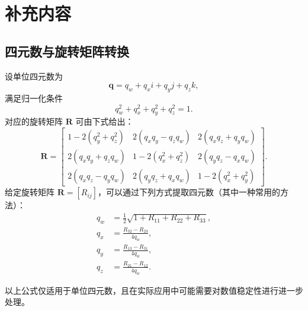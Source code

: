 
\chapter{补充内容}

\section{四元数与旋转矩阵转换}
\label{appendix:quat}
设单位四元数为
\begin{equation}
\symbf{q} = q_w + q_x i + q_y j + q_z k,
\end{equation}
满足归一化条件
\begin{equation}
q_w^2 + q_x^2 + q_y^2 + q_z^2 = 1.
\end{equation}
对应的旋转矩阵 \(\symbf{R}\) 可由下式给出：
\begin{equation}
  \symbf{R} = \begin{bmatrix}
1 - 2(q_y^2 + q_z^2) & 2(q_xq_y - q_zq_w) & 2(q_xq_z + q_yq_w) \\
2(q_xq_y + q_zq_w) & 1 - 2(q_x^2 + q_z^2) & 2(q_yq_z - q_xq_w) \\
2(q_xq_z - q_yq_w) & 2(q_yq_z + q_xq_w) & 1 - 2(q_x^2 + q_y^2)
\end{bmatrix}.
\end{equation}
给定旋转矩阵 \(\symbf{R} = [R_{ij}]\)，可以通过下列方式提取四元数（其中一种常用的方法）：
\begin{align}
  q_w &= \frac{1}{2}\sqrt{1 + R_{11} + R_{22} + R_{33}},\\
  q_x &= \frac{R_{32} - R_{23}}{4q_w},\\
  q_y &= \frac{R_{13} - R_{31}}{4q_w},\\
  q_z &= \frac{R_{21} - R_{12}}{4q_w}.
\end{align}

以上公式仅适用于单位四元数，且在实际应用中可能需要对数值稳定性进行进一步处理。



